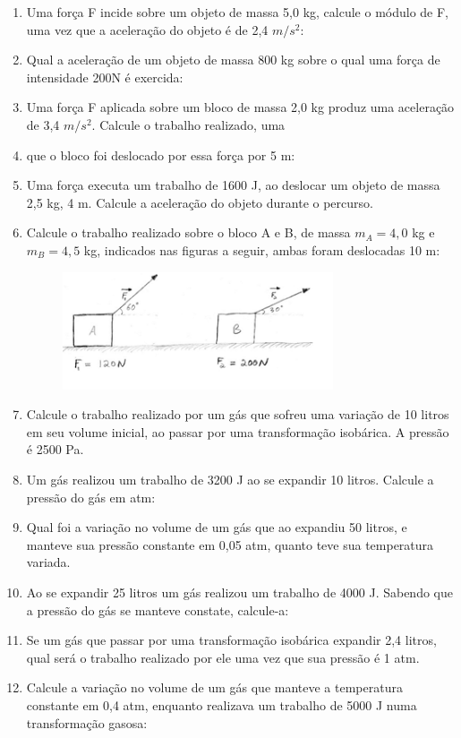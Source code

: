 \documentclass[12pt,a4paper]{book}
\begin{document}
\begin{enumerate}
\item Uma força F incide sobre um objeto de massa 5,0 kg, calcule o módulo de F, uma vez que a aceleração do objeto é de 2,4 $m/s^2$:
\item Qual a aceleração de um objeto de massa 800 kg sobre o qual uma força de intensidade 200N é exercida:
\item Uma força F aplicada sobre um bloco de massa 2,0 kg produz uma aceleração de 3,4 $m/s^2$. Calcule o trabalho realizado, uma \item  que o bloco foi deslocado por essa força por 5 m:
\item  Uma força executa um trabalho de 1600 J, ao deslocar um objeto de massa 2,5 kg, 4 m. Calcule a aceleração do objeto durante o percurso.
\item  Calcule o trabalho realizado sobre o bloco A e B, de massa $m_A = 4,0$ kg e $m_B = 4,5$ kg, indicados nas figuras a seguir, ambas foram deslocadas 10 m:

	\begin{figure}[h]
	\center
	\includegraphics[width=8cm]{dinamica1ex1.png}
	\label{omeubrowser}
	\end{figure}

\item  Calcule o trabalho realizado por um gás que sofreu uma variação de 10 litros em seu volume inicial, ao passar por uma transformação isobárica. A pressão é 2500 Pa.
\item  Um gás realizou um trabalho de 3200 J ao se expandir 10 litros. Calcule a pressão do gás em atm:
\item  Qual foi a variação no volume de um gás que ao expandiu 50 litros, e manteve sua pressão constante em 0,05 atm, quanto teve sua temperatura variada.  
\item  Ao se expandir 25 litros um gás realizou um trabalho de 4000 J. Sabendo que a pressão do gás se manteve constate, calcule-a:
\item  Se um gás que passar por uma transformação isobárica expandir 2,4 litros, qual será o trabalho realizado por ele uma vez que sua pressão é 1 atm.
\item  Calcule a variação no volume de um gás que manteve a temperatura constante em 0,4 atm, enquanto realizava um trabalho de 5000 J numa transformação gasosa:

\end{enumerate}
\end{document}
